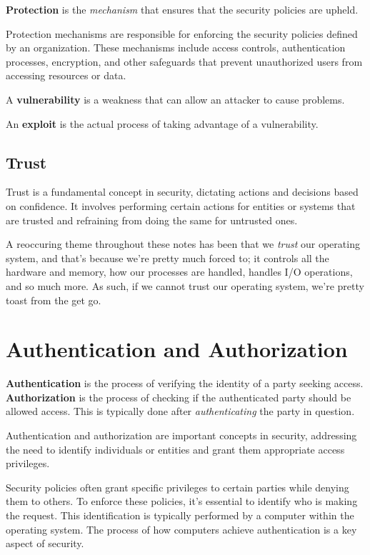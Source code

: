 \documentclass{report}
\newcommand{\definitionBegin}[1]{\begin{tcolorbox}[title={Definition: #1}]}
\newcommand{\definitionEnd}{\end{tcolorbox}}
\begin{document}
\definitionBegin{Protection}
\textbf{Protection} is the \textit{mechanism} that ensures that the security policies are upheld.
\definitionEnd

Protection mechanisms are responsible for enforcing the security policies defined by an
organization. These mechanisms include access controls, authentication processes, encryption, and
other safeguards that prevent unauthorized users from accessing resources or data.

\definitionBegin{Vulnerability}
A \textbf{vulnerability} is a weakness that can allow an attacker to cause problems.
\definitionEnd

\definitionBegin{Exploit}
An \textbf{exploit} is the actual process of taking advantage of a vulnerability.
\definitionEnd


\subsection{Trust}
Trust is a fundamental concept in security, dictating actions and decisions based on confidence. It
involves performing certain actions for entities or systems that are trusted and refraining from
doing the same for untrusted ones. 

A reoccuring theme throughout these notes has been that we \textit{trust} our operating system, and
that's because we're pretty much forced to; it controls all the hardware and memory, how our
processes are handled, handles I/O operations, and so much more. As such, if we cannot trust our
operating system, we're pretty toast from the get go.





\section{Authentication and Authorization}
\label{sect:AUTH}
\definitionBegin{Authentication and Authorization}
\textbf{Authentication} is the process of verifying the identity of a party seeking access.
\tcblower
\textbf{Authorization} is the process of checking if the authenticated party should be allowed
access. This is typically done after \textit{authenticating} the party in question.
\definitionEnd

Authentication and authorization are important concepts in security, addressing the need to identify
individuals or entities and grant them appropriate access privileges.

Security policies often grant specific privileges to certain parties while denying them to
others. To enforce these policies, it's essential to identify who is making the request. This
identification is typically performed by a computer within the operating system. The process of
how computers achieve authentication is a key aspect of security. 
\end{document}
